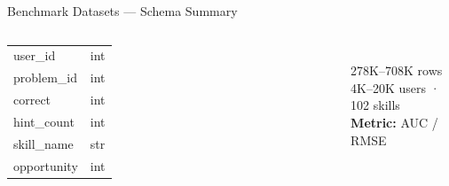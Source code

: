 \documentclass[aspectratio=169,12pt]{beamer}
\begin{document}
\begin{frame}{Benchmark Datasets — Schema Summary}
\begin{columns}
{\begin{tabular}{ll}
        \midrule
        user\_id & int \\
        problem\_id & int \\
        correct & int \\
        hint\_count & int \\
        skill\_name & str \\
        opportunity & int \\
        \bottomrule
      \end{tabular}}
      \vspace{4pt}\\
      \scriptsize 278K–708K rows\\
      4K–20K users · 102 skills\\
      \textbf{Metric:} AUC / RMSE
  \end{columns}
\end{frame}
\end{document}
